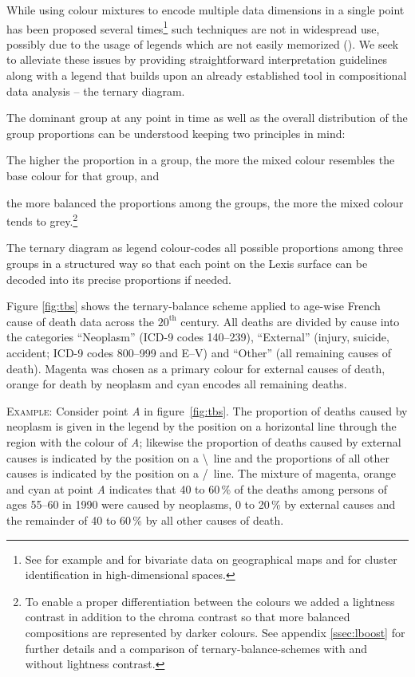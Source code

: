 \documentclass[parskip=half]{scrartcl}
\begin{document}
While using colour mixtures to encode multiple data dimensions in a single point has been proposed several times\footnote{
  See for example \textcite{Trumbo1981} and \textcite{Eyton1984} for bivariate data on geographical maps and \textcite{Ware1988} for cluster identification in high-dimensional spaces.
}
such techniques are not in widespread use, possibly due to the usage of legends which are not easily memorized (\cite{Wainer1980}). We seek to alleviate these issues by providing straightforward interpretation guidelines along with a legend that builds upon an already established tool in compositional data analysis -- the ternary diagram.

The dominant group at any point in time as well as the overall distribution of the group proportions can be understood keeping two principles in mind:

\begin{compactenum}
  \item The higher the proportion in a group, the more the mixed colour resembles the base colour for that group, and
  \item the more balanced the proportions among the groups, the more the mixed colour tends to grey.\footnote{
  To enable a proper differentiation between the colours we added a lightness contrast in addition to the chroma contrast so that more balanced compositions are represented by darker colours. See appendix \ref{ssec:lboost} for further details and a comparison of ternary-balance-schemes with and without lightness contrast.
  }
\end{compactenum}

The ternary diagram as legend colour-codes all possible proportions among three groups in a structured way so that each point on the Lexis surface can be decoded into its precise proportions if needed.

Figure \ref{fig:tbs} shows the ternary-balance scheme applied to age-wise French cause of death data across the $20^\text{th}$ century. All deaths are divided by cause into the categories \enquote{Neoplasm} (ICD-9 codes 140--239), \enquote{External} (injury, suicide, accident; ICD-9 codes 800--999 and E--V) and \enquote{Other} (all remaining causes of death). Magenta was chosen as a primary colour for external causes of death, orange for death by neoplasm and cyan encodes all remaining deaths.

\textsc{Example:} Consider point \emph{A} in figure~\ref{fig:tbs}. The proportion of deaths caused by neoplasm is given in the legend by the position on a horizontal line through the region with the colour of \emph{A}; likewise the proportion of deaths caused by external causes is indicated by the position on a \textbackslash~line and the proportions of all other causes is indicated by the position on a /~line. The mixture of magenta, orange and cyan at point \emph{A} indicates that 40 to 60\,\% of the deaths among persons of ages 55--60 in 1990 were caused by neoplasms, 0 to 20\,\% by external causes and the remainder of 40 to 60\,\% by all other causes of death.
\end{document}
